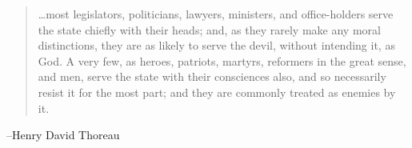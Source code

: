 \documentclass{exam}
\begin{document}
  \else
    \vspace{1 cm}
    \begin{quote}
      \begin{em}
        \ldots most legislators, politicians, lawyers, ministers, and office-holders serve the state chiefly with their
        heads; and, as they rarely make any moral distinctions, they are as likely to serve the devil, without intending
        it, as God. A very few, as heroes, patriots, martyrs, reformers in the great sense, and men, serve the state with
        their consciences also, and so necessarily resist it for the most part; and they are commonly treated as enemies
        by it.      
      \end{em}
    \end{quote}
    \hspace{1 cm} --Henry David Thoreau
  \fi



\end{document}

